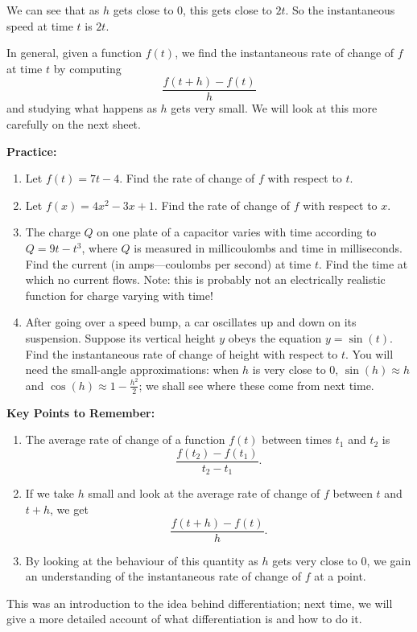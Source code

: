 \documentclass{article}
\begin{document}
We can see that as $h$ gets close to 0, this gets close to $2t$. So the instantaneous speed at time $t$ is $2t$.\bigskip

In general, given a function $f(t)$, we find the instantaneous rate of change of $f$ at time $t$ by computing
\[\frac{f(t+h)-f(t)}{h}\]
and studying what happens as $h$ gets very small. We will look at this more carefully on the next sheet.


\clearpage



\textbf{Practice:}

\vspace{5mm}

\begin{enumerate}
	\item Let $f(t)=7t-4$. Find the rate of change of $f$ with respect to $t$.
	\item Let $f(x)=4x^2-3x+1$. Find the rate of change of $f$ with respect to $x$.
	\item The charge $Q$ on one plate of a capacitor varies with time according to $Q=9t-t^3$, where $Q$ is measured in millicoulombs and time in milliseconds. Find the current (in amps---coulombs per second) at time $t$. Find the time at which no current flows. Note: this is probably not an electrically realistic function for charge varying with time!
	\item After going over a speed bump, a car oscillates up and down on its suspension. Suppose its vertical height $y$ obeys the equation $y=\sin(t)$. Find the instantaneous rate of change of height with respect to $t$. You will need the small-angle approximations: when $h$ is very close to 0, $\sin(h)\approx h$ and $\cos(h)\approx 1-\frac{h^2}{2}$; we shall see where these come from next time.
\end{enumerate}





\clearpage


{\bf Key Points to Remember:}

\vspace{5mm}

\begin{enumerate}
\item The average rate of change of a function $f(t)$ between times $t_1$ and $t_2$ is
	\[\frac{f(t_2)-f(t_1)}{t_2-t_1}.\]
\item If we take $h$ small and look at the average rate of change of $f$ between $t$ and $t+h$, we get
	\[\frac{f(t+h)-f(t)}{h}.\]
\item By looking at the behaviour of this quantity as $h$ gets very close to 0, we gain an understanding of the instantaneous rate of change of $f$ at a point.
\end{enumerate}

\bigskip

This was an introduction to the idea behind differentiation; next time, we will give a more detailed account of what differentiation is and how to do it.
\end{document}
